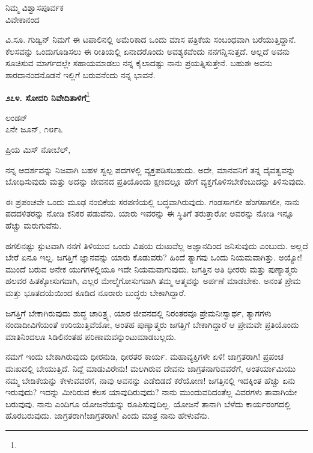 \begin{flushright}
ನಿಮ್ಮ ವಿಶ್ವಾಸಪೂರ್ವಕ\\ವಿವೇಕಾನಂದ
\end{flushright}

ವಿ.ಸೂ.\enginline{-} ಗುಡ್ವಿನ್ ನಿಮಗೆ ಈ ಟಪಾಲಿನಲ್ಲಿ ಅಮೆರಿಕಾದ ಒಂದು ಮಾಸ ಪತ್ರಿಕೆಯ ಸಂಬಂಧವಾಗಿ ಬರೆಯುತ್ತಿದ್ದಾನೆ. ಕೆಲಸವನ್ನು ಒಂದುಗೂಡಿಸಲು ಈ ರೀತಿಯಲ್ಲಿ ಏನಾದರೊಂದು ಅವಶ್ಯಕವೆಂದು ನನಗನ್ನಿಸುತ್ತದೆ. ಅಲ್ಲದೆ ಅವನು ಸೂಚಿಸುವ ಮಾರ್ಗದಲ್ಲೇ ಸಹಾಯಮಾಡಲು ನನ್ನ ಕೈಲಾದಷ್ಟು ನಾನು ಪ್ರಯತ್ನಿಸುತ್ತೇನೆ. ಬಹುಶಃ ಅವನು ಶಾರದಾ\break ನಂದನೊಡನೆ ಇಲ್ಲಿಗೆ ಬರುವನೆಂದು ನನ್ನ ಭಾವನೆ.

\eject

\begin{center}
\textbf{೨೭೪. ಸೋದರಿ ನಿವೇದಿತಾಳಿಗೆ}\footnote{}
\end{center}

\begin{flushright}
ಲಂಡನ್\\೭ನೇ ಜೂನ್, ೧೮೯೬
\end{flushright}

\noindent
ಪ್ರಿಯ ಮಿಸ್ ನೋಬೆಲ್,

ನನ್ನ ಆದರ್ಶವನ್ನು ನಿಜವಾಗಿ ಬಹಳ ಸ್ವಲ್ಪ ಪದಗಳಲ್ಲಿ ವ್ಯಕ್ತಪಡಿಸಬಹುದು. ಅದೇ, ಮಾನವನಿಗೆ ತನ್ನ ದೈವತ್ವವನ್ನು ಬೋಧಿಸುವುದು ಮತ್ತು ಅದನ್ನು ಜೀವನದ ಪ್ರತಿಯೊಂದು ಕ್ಷಣದಲ್ಲೂ ಹೇಗೆ ವ್ಯಕ್ತಗೊಳಿಸಬೇಕೆಂಬುದನ್ನು ತಿಳಿಸುವುದು.

ಈ ಪ್ರಪಂಚವೇ ಒಂದು ಮೂಢ ನಂಬಿಕೆಯ ಸರಪಣಿಯಲ್ಲಿ ಬದ್ಧವಾಗಿರುವುದು. ಗಂಡಸಾಗಲೀ ಹೆಂಗಸಾಗಲೀ, ನಾನು ಪದದಳಿತರನ್ನು ನೋಡಿ ಕನಿಕರ ಪಡುವೆನು. ಯಾರು ಇವರನ್ನು ಈ ಸ್ಥಿತಿಗೆ ತರುತ್ತಾರೋ ಅವರನ್ನು ನೋಡಿ ಇನ್ನೂ ಹೆಚ್ಚು ಮರುಗುವೆನು.

ಹಗಲಿನಷ್ಟು ಸ್ಪುಟವಾಗಿ ನನಗೆ ತಿಳಿಯುವ ಒಂದು ವಿಷಯ ದುಃಖವೆಲ್ಲ ಅಜ್ಞಾನದಿಂದ ಜನಿಸುವುದು ಎಂಬುದು. ಅಲ್ಲದೆ ಬೇರೆ ಏನೂ ಇಲ್ಲ. ಜಗತ್ತಿಗೆ ಜ್ಞಾನವನ್ನು ಯಾರು ಕೊಡುವರು? ಹಿಂದೆ ತ್ಯಾಗವು ಒಂದು ನಿಯಮವಾಗಿತ್ತು. ಅಯ್ಯೋ! ಮುಂದೆ ಬರುವ ಅನೇಕ ಯುಗಗಳಲ್ಲಿಯೂ ಇದೇ ನಿಯಮವಾಗುವುದು. ಜಗತ್ತಿನ ಅತಿ ಧೀರರು ಮತ್ತು ಪುಣ್ಯಾತ್ಮರು ಹಲವರ ಹಿತಕ್ಕೋಸುಗವಾಗಿ, ಎಲ್ಲರ ಮೇಲ್ಮೆಗೋಸುಗವಾಗಿ ತಮ್ಮ ಆತ್ಮವನ್ನು ಅರ್ಪಣೆ ಮಾಡಬೇಕು. ಅನಂತ ಪ್ರೇಮ ಮತ್ತು ಭೂತದಯೆಯಿಂದ ಕೂಡಿದ ನೂರಾರು ಬುದ್ಧರು ಬೇಕಾಗಿದ್ದಾರೆ.

ಜಗತ್ತಿಗೆ ಬೇಕಾಗಿರುವುದು ಶುದ್ಧ ಚಾರಿತ್ರ್ಯ, ಯಾರ ಜೀವನದಲ್ಲಿ ನಿರಂತರವೂ ಪ್ರೇಮನಿಃಸ್ವಾರ್ಥ, ತ್ಯಾಗಗಳು ನಂದಾದೀವಿಗೆಯಂತೆ ಉರಿಯುತ್ತಿವೆಯೋ, ಅಂತಹ ಪುಣ್ಯಾತ್ಮರು ಜಗತ್ತಿಗೆ ಬೇಕಾಗಿದ್ದಾರೆ ಆ ಪ್ರೇಮವೇ ಪ್ರತಿಯೊಂದು ಮಾತಿನಿಂದಲೂ ಸಿಡಿಲಿನಂತಹ ಪರಿಣಾಮವನ್ನುಂಟುಮಾಡಬಲ್ಲದು.

ನಮಗೆ ಇಂದು ಬೇಕಾಗಿರುವುದು ಧೀರನುಡಿ, ಧೀರತರ ಕಾರ್ಯ. ಮಹಾವ್ಯಕ್ತಿಗಳೇ ಏಳಿ! ಜಾಗ್ರತರಾಗಿ! ಪ್ರಪಂಚ ದುಃಖದಲ್ಲಿ ಬೇಯುತ್ತಿದೆ. ನಿದ್ದೆ ಮಾಡುವಿರೇನು! ಮಲಗಿರುವ ದೇವನು ಜಾಗ್ರತನಾಗುವವರೆಗೆ, ಅಂತರ್ಯಾಮಿಯು ನಮ್ಮ ಬೇಡಿಕೆಯನ್ನು ಕೇಳುವವರೆಗೆ, ನಾವು ಅವನನ್ನು ಎಡೆಬಿಡದೆ ಕರೆಯೋಣ! ಜಗತ್ತಿನಲ್ಲಿ ಇದಕ್ಕಿಂತ ಹೆಚ್ಚು ಏನು ಇರುವುದು? ಇದನ್ನು ಮೀರಿರುವ ಕೆಲಸ ಯಾವುದಿರುವುದು? ನಾನು ಮುಂದುವರಿದಂತೆಲ್ಲ ವಿವರಗಳು ತಾವಾಗಿಯೇ ಬರುವುವು. ನಾನು ಎಂದಿಗೂ ಯೋಜನೆಯನ್ನು ರೂಪಿಸುವುದಿಲ್ಲ. ಯೋಜನೆ ತಾನಾಗಿ ಬೆಳೆದು ಕಾರ್ಯರಂಗದಲ್ಲಿ ಹೊರಬರುವುದು. ಜಾಗ್ರತರಾಗಿ!ಜಾಗ್ರತರಾಗಿ! ಎಂದು ಮಾತ್ರ ನಾನು ಹೇಳುವೆನು.

